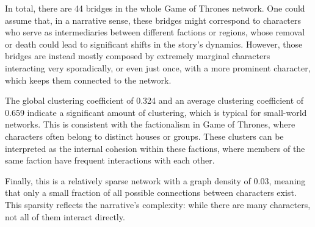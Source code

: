 \documentclass[10pt,twocolumn,letterpaper]{article}
\begin{document}
In total, there are 44 bridges in the whole Game of Thrones network. One could assume that, in a narrative sense, these bridges might correspond to characters who serve as intermediaries between different factions or regions, whose removal or death could lead to significant shifts in the story's dynamics. However, those bridges are instead mostly composed by extremely marginal characters interacting very sporadically, or even just once, with a more prominent character, which keeps them connected to the network.

The global clustering coefficient of 0.324 and an average clustering coefficient of 0.659 indicate a significant amount of clustering, which is typical for small-world networks. This is consistent with the factionalism in Game of Thrones, where characters often belong to distinct houses or groups. These clusters can be interpreted as the internal cohesion within these factions, where members of the same faction have frequent interactions with each other.

Finally, this is a relatively sparse network with a graph density of 0.03, meaning that only a small fraction of all possible connections between characters exist. This sparsity reflects the narrative's complexity: while there are many characters, not all of them interact directly. 
\end{document}
